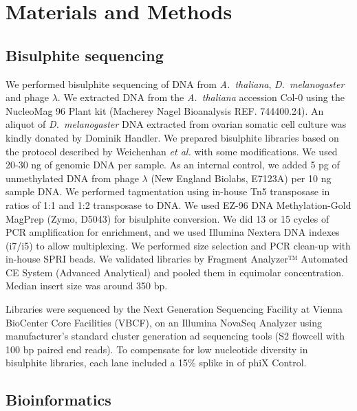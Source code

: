 \documentclass[10pt,letterpaper,draft]{article}
\begin{document}
\section*{Materials and Methods}

\subsection*{Bisulphite sequencing}

We performed bisulphite sequencing of DNA from \textit{A.~thaliana}, \emph{D.~melanogaster} and phage $\lambda$.
We extracted DNA from the \textit{A.~thaliana} accession Col-0 using the NucleoMag 96 Plant kit (Macherey Nagel Bioanalysis REF. 744400.24).
An aliquot of \textit{D.~melanogaster} DNA extracted from ovarian somatic cell culture \cite{niki2006establishment, saito2009regulatory} was kindly donated by Dominik Handler.
We prepared bisulphite libraries based on the protocol described by Weichenhan \textit{et al.} \cite{weichenhan2019generation} with some modifications.
We used 20-30 ng of genomic DNA per sample.
As an internal control, we added 5 pg of unmethylated DNA from phage $\lambda$ (New England Biolabs, E7123A) per 10 ng sample DNA.
We performed tagmentation using in-house Tn5 transposase \cite{picelli2014tn5} in ratios of 1:1 and 1:2 transposase to DNA.
We used EZ-96 DNA Methylation-Gold MagPrep (Zymo, D5043) for bisulphite conversion.
We did 13 or 15 cycles of PCR amplification for enrichment, and we used Illumina Nextera DNA indexes (i7/i5) to allow multiplexing.
We performed size selection and PCR clean-up with in-house SPRI beads.
We validated libraries by Fragment Analyzer™ Automated CE System (Advanced Analytical) and pooled them in equimolar concentration.
Median insert size was around 350 bp.

Libraries were sequenced by the Next Generation Sequencing Facility at Vienna BioCenter Core Facilities (VBCF), on an Illumina NovaSeq Analyzer using manufacturer’s standard cluster generation ad sequencing tools (S2 flowcell with 100 bp paired end reads).
To compensate for low nucleotide diversity in bisulphite libraries, each lane included a 15\% splike in of phiX Control.

\subsection*{Bioinformatics}
\end{document}
